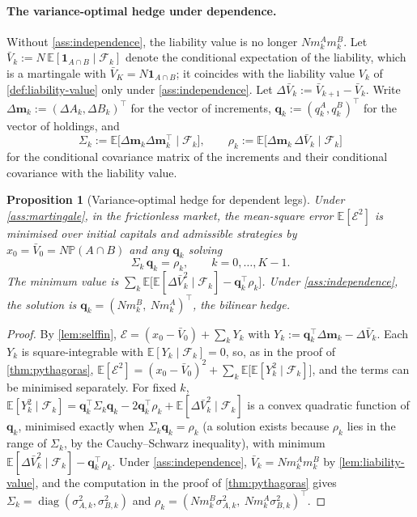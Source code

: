 \documentclass[11pt,a4paper]{article}
\theoremstyle{plain}
\newtheorem{proposition}[theorem]{Proposition}
\theoremstyle{definition}
\theoremstyle{remark}
\newcommand{\E}{\mathbb{E}}
\newcommand{\Prob}{\mathbb{P}}
\newcommand{\1}{\mathbf{1}}
\newcommand{\F}{\mathcal{F}}
\begin{document}
\paragraph{The variance-optimal hedge under dependence.}
Without \cref{ass:independence}, the liability value is no longer $Nm^A_km^B_k$. Let $\bar V_k := N\,\E[\1_{A\cap B}\mid\F_k]$ denote the conditional expectation of the liability, which is a martingale with $\bar V_K = N\1_{A\cap B}$; it coincides with the liability value $V_k$ of \cref{def:liability-value} only under \cref{ass:independence}. Let $\Delta\bar V_k := \bar V_{k+1}-\bar V_k$. Write $\Delta\mathbf{m}_k := (\Delta A_k,\Delta B_k)^\top$ for the vector of increments, $\mathbf{q}_k := (q^A_k,q^B_k)^\top$ for the vector of holdings, and
\[
\Sigma_k := \E\bigl[\Delta\mathbf{m}_k\Delta\mathbf{m}_k^\top\mid\F_k\bigr],\qquad \rho_k := \E\bigl[\Delta\mathbf{m}_k\,\Delta\bar V_k\mid\F_k\bigr]
\]
for the conditional covariance matrix of the increments and their conditional covariance with the liability value.

\begin{proposition}[Variance-optimal hedge for dependent legs]
\label{prop:general-hedge}
Under \cref{ass:martingale}, in the frictionless market, the mean-square error $\E[\mathcal{E}^2]$ is minimised over initial capitals and admissible strategies by $x_0 = \bar V_0 = N\Prob(A\cap B)$ and any $\mathbf{q}_k$ solving
\[
\Sigma_k\,\mathbf{q}_k = \rho_k,\qquad k=0,\dots,K-1.
\]
The minimum value is $\sum_k\E\bigl[\E[\Delta\bar V_k^2\mid\F_k] - \mathbf{q}_k^\top\rho_k\bigr]$. Under \cref{ass:independence}, the solution is $\mathbf{q}_k = (Nm^B_k,\ Nm^A_k)^\top$, the bilinear hedge.
\end{proposition}

\begin{proof}
By \cref{lem:selffin}, $\mathcal{E} = (x_0 - \bar V_0) + \sum_k Y_k$ with $Y_k := \mathbf{q}_k^\top\Delta\mathbf{m}_k - \Delta\bar V_k$. Each $Y_k$ is square-integrable with $\E[Y_k\mid\F_k]=0$, so, as in the proof of \cref{thm:pythagoras}, $\E[\mathcal{E}^2] = (x_0-\bar V_0)^2 + \sum_k\E\bigl[\E[Y_k^2\mid\F_k]\bigr]$, and the terms can be minimised separately. For fixed $k$, $\E[Y_k^2\mid\F_k] = \mathbf{q}_k^\top\Sigma_k\mathbf{q}_k - 2\mathbf{q}_k^\top\rho_k + \E[\Delta\bar V_k^2\mid\F_k]$ is a convex quadratic function of $\mathbf{q}_k$, minimised exactly when $\Sigma_k\mathbf{q}_k = \rho_k$ (a solution exists because $\rho_k$ lies in the range of $\Sigma_k$, by the Cauchy--Schwarz inequality), with minimum $\E[\Delta\bar V_k^2\mid\F_k] - \mathbf{q}_k^\top\rho_k$. Under \cref{ass:independence}, $\bar V_k = Nm^A_km^B_k$ by \cref{lem:liability-value}, and the computation in the proof of \cref{thm:pythagoras} gives $\Sigma_k = \operatorname{diag}(\sigma^2_{A,k},\sigma^2_{B,k})$ and $\rho_k = (Nm^B_k\sigma^2_{A,k},\ Nm^A_k\sigma^2_{B,k})^\top$.
\end{proof}
\end{document}
